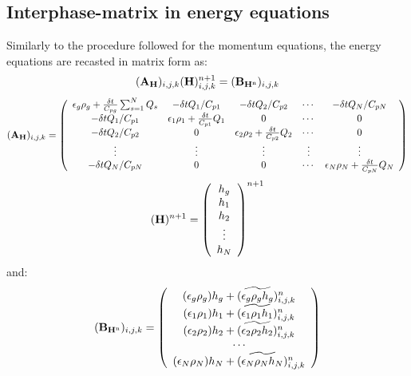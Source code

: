 \subsection{Interphase-matrix in energy equations}

Similarly to the procedure followed for the momentum equations, the energy equations
are recasted in matrix form as:
%
\begin{eqnarray}
\htmlimage{}
({\bf A_H})_{i,j,k} ({\bf H})_{i,j,k}^{n+1} = ({\bf B_{H^{\rm n}}})_{i,j,k}
\nonumber
\end{eqnarray}
%
\begin{eqnarray}
({\bf A_H})_{i,j,k} = \left ( \begin{array}{ccccc}
\epsilon_g \rho_g + \frac{\delta t}{C_{pg}} \sum_{s=1}^{N} Q_s & -\delta t Q_1/ C_{p1} & -\delta t Q_2/ C_{p2}  & \cdots & -\delta t Q_N/ C_{pN} \\
-\delta t Q_1/ C_{p1} & \epsilon_1 \rho_1 + \frac{\delta t}{C_{p1}} Q_{1} & 0 & \cdots & 0  \\
-\delta t Q_2/ C_{p2} & 0 & \epsilon_2 \rho_2 + \frac{\delta t}{C_{p2}} Q_{2} & \cdots & 0  \\
\vdots  & \vdots  & \vdots  & \vdots  & \vdots   \\
-\delta t Q_N/ C_{pN} &  0  &  0  &  \cdots   & \epsilon_N \rho_N + \frac{\delta t}{C_{pN}} Q_{N}
\end{array} \right )
\nonumber
\end{eqnarray}
%
\begin{eqnarray}
\htmlimage{}
({\bf H})^{n+1} =  \left( \begin{array}{c}
h_g \\
h_1 \\
h_2 \\
\vdots \\
h_N \end{array} \right )^{n+1} 
\nonumber
\end{eqnarray}
%
and:
%
\begin{eqnarray}
\htmlimage{}
({\bf B_{H^{\rm n}}})_{i,j,k}=  \left ( \begin{array}{c}
(\epsilon_g \rho_g) h_g + (\widetilde{\epsilon_g \rho_g h_g})^n_{i,j,k} \\
(\epsilon_1 \rho_1) h_1 + (\widetilde{\epsilon_1 \rho_1 h_1})^n_{i,j,k} \\
(\epsilon_2 \rho_2) h_2 + (\widetilde{\epsilon_2 \rho_2 h_2})^n_{i,j,k} \\
\cdots \\
(\epsilon_N \rho_N) h_N + (\widetilde{\epsilon_N \rho_N h_N})^n_{i,j,k} \\
\end{array} \right )
\nonumber
\end{eqnarray}
%
\newpage

%
\clearpage
